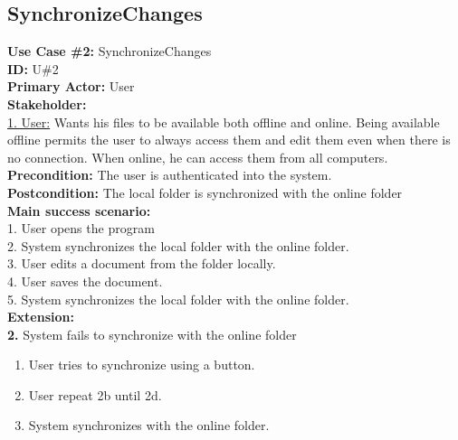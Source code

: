 \subsection{SynchronizeChanges}
\textbf{Use Case \#2:} SynchronizeChanges\\
\textbf{ID:} U\#2\\
\textbf{Primary Actor:} User \\
\textbf{Stakeholder:}\\
\underline{1. User:} Wants his files to be available both offline and online. Being available offline permits the user to always access them and edit them even when there is no connection. When online, he can access them from all computers.\\
\newline
\textbf{Precondition:} The user is authenticated into the system.\\
\textbf{Postcondition:} The local folder is synchronized with the online folder\\
\newline
\textbf{Main success scenario:}\\
1. User opens the program\\
2. System synchronizes the local folder with the online folder.\\
3. User edits a document from the folder locally.\\
4. User saves the document.\\
5. System synchronizes the local folder with the online folder.\\
\newline
\textbf{Extension:}\\
\textbf{2.} System fails to synchronize with the online folder
\begin{enumerate}
\item User tries to synchronize using a button.
\item User repeat 2b until 2d.
\item System synchronizes with the online folder.
\end{enumerate}

